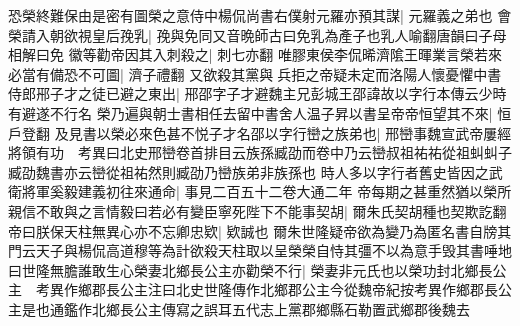 恐榮終難保由是密有圖榮之意侍中楊侃尚書右僕射元羅亦預其謀|{
	元羅義之弟也}
會榮請入朝欲視皇后㝃乳|{
	㝃與免同又音晩師古曰免乳為產子也乳人喻翻唐韻曰子母相解曰免}
徽等勸帝因其入刺殺之|{
	刺七亦翻}
唯膠東侯李侃晞濟隂王暉業言榮若來必當有備恐不可圖|{
	濟子禮翻}
又欲殺其黨與兵拒之帝疑未定而洛陽人懷憂懼中書侍郎郉子才之徒已避之東出|{
	郉邵字子才避魏主兄彭城王邵諱故以字行本傳云少時有避遂不行名}
榮乃遍與朝士書相任去留中書舍人温子昇以書呈帝帝恒望其不來|{
	恒戶登翻}
及見書以榮必來色甚不悦子才名邵以字行巒之族弟也|{
	邢巒事魏宣武帝屢經將領有功　考異曰北史邢巒卷首排目云族孫臧劭而卷中乃云巒叔祖祐祐從祖虯虯子臧劭魏書亦云巒從祖祐然則臧劭乃巒族弟非族孫也}
時人多以字行者舊史皆因之武衛將軍奚毅建義初往來通命|{
	事見二百五十二卷大通二年}
帝每期之甚重然猶以榮所親信不敢與之言情毅曰若必有變臣寧死陛下不能事契胡|{
	爾朱氏契胡種也契欺訖翻}
帝曰朕保天柱無異心亦不忘卿忠欵|{
	欵誠也}
爾朱世隆疑帝欲為變乃為匿名書自牓其門云天子與楊侃高道穆等為計欲殺天柱取以呈榮榮自恃其彊不以為意手毁其書唾地曰世隆無膽誰敢生心榮妻北鄉長公主亦勸榮不行|{
	榮妻非元氏也以榮功封北鄉長公主　考異作鄉郡長公主注曰北史世隆傳作北鄉郡公主今從魏帝紀按考異作鄉郡長公主是也通鑑作北鄉長公主傳寫之誤耳五代志上黨郡鄉縣石勒置武鄉郡後魏去}


